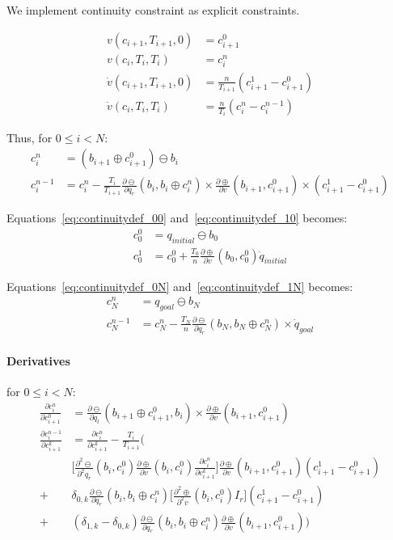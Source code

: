 \documentclass {article}
\newcommand\splinev[3]{v(#1, #2, #3)}
\newcommand\splineva[2]{\splinev{c_{#1}}{T_{#1}}{#2}}
\newcommand\dotsplinev[3]{\dot{v}(#1, #2, #3)}
\newcommand\dotsplineva[2]{\dotsplinev{c_{#1}}{T_{#1}}{#2}}
\newcommand\Jplusv[2]{\frac{\partial\oplus}{\partial{v}}(#1,#2)}
\newcommand\Jminusl[2]{\frac{\partial\ominus}{\partial{q_l}}(#1,#2)}
\newcommand\Jminusr[2]{\frac{\partial\ominus}{\partial{q_r}}(#1,#2)}
\newcommand\Hplusvv[2]{\frac{\partial^2\oplus}{\partial^2{v}}(#1,#2)}
\newcommand\Hminusrr[2]{\frac{\partial^2\ominus}{\partial^2{q_r}}(#1,#2)}
\begin{document}
We implement continuity constraint as explicit constraints.

\begin{align*}
  \splineva{i+1}{0} &= c_{i+1}^{0} \\
  \splineva{i}{T_i} &= c_{i}^{n}   \\
  \dotsplineva{i+1}{0} &= \frac{n}{T_{i+1}} (c_{i+1}^{1}-c_{i+1}^0) \\
  \dotsplineva{i}{T_i} &= \frac{n}{T_i} (c_i^{n} - c_i^{n-1})
\end{align*}

Thus, for $0 \le i < N$:
\begin{align*}
  c_i^n     &= (b_{i+1} \oplus c_{i+1}^{0}) \ominus b_i \\
  c_i^{n-1} &= c_i^n - \frac{T_i}{T_{i+1}}
  \Jminusr{b_i}{b_i\oplus c_i^n} \times
  \Jplusv{b_{i+1}}{c_{i+1}^0} \times
  (c_{i+1}^{1}-c_{i+1}^0)
\end{align*}

Equations~\eqref{eq:continuitydef_00} and~\eqref{eq:continuitydef_10} becomes:
\begin{align*}
  c_0^0 &= q_{initial} \ominus b_0 \\
  c_0^1 &= c_0^0 + \frac{T_0}{n}
  \Jplusv{b_0}{c_0^0}
  \dot{q}_{initial}
\end{align*}

Equations~\eqref{eq:continuitydef_0N} and~\eqref{eq:continuitydef_1N} becomes:
\begin{align*}
  c_N^n     &= q_{goal} \ominus b_N \\
  c_N^{n-1} &= c_N^n - \frac{T_N}{n}
  \Jminusr{b_N}{b_N\oplus c_N^n} \times
  \dot{q}_{goal}
\end{align*}

\paragraph{Derivatives} for $0 \le i < N$:
\begin{align*}
  \frac{\partial{c_i^n}}{\partial{c^0_{i+1}}} &=
  \Jminusl{b_{i+1} \oplus c_{i+1}^{0}}{b_i} \times
  \Jplusv{b_{i+1}}{c_{i+1}^{0}} \\
%
  \frac{\partial{c_i^{n-1}}}{\partial{c^k_{i+1}}} &=
  \frac{\partial{c_i^n}}{\partial{c^k_{i+1}}} - \frac{T_i}{T_{i+1}}
  \Bigg(
  \\
  & \bigg[
    \Hminusrr{b_i}{c_i^0}
    \Jplusv{b_i}{c_i^0}
    \frac{\partial{c_i^n}}{\partial{c^k_{i+1}}}
  \bigg]
  \Jplusv{b_{i+1}}{c_{i+1}^0}
  (c_{i+1}^{1}-c_{i+1}^0)
  \\
  + &
  \delta_{0,k}
  \Jminusr{b_i}{b_i\oplus c_i^n}
  \bigg[
    \Hplusvv{b_i}{c_i^0}
    I_r
  \bigg]
  (c_{i+1}^{1}-c_{i+1}^0)
  \\
  + &
  (\delta_{1,k} - \delta_{0,k})
  \Jminusr{b_i}{b_i\oplus c_i^n}
  \Jplusv{b_{i+1}}{c_{i+1}^0}
  \Bigg)
\end{align*}
\end{document}
